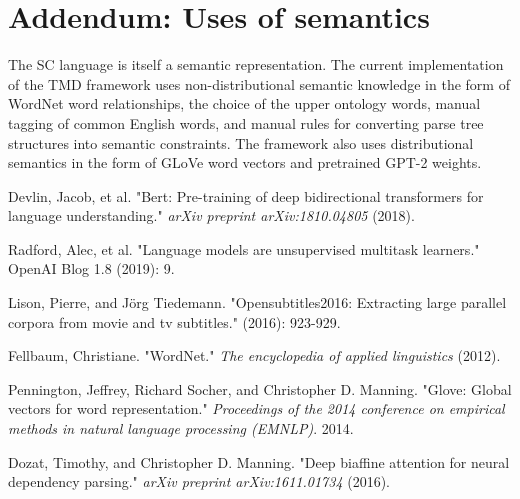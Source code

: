 \documentclass{article}
\numberwithin{equation}{section}
\begin{document}
\section{Addendum: Uses of semantics}
The SC language is itself a semantic representation. The current implementation of the TMD framework uses non-distributional semantic knowledge in the form of WordNet word relationships, the choice of the upper ontology words, manual tagging of common English words, and manual rules for converting parse tree structures into semantic constraints. The framework also uses distributional semantics in the form of GLoVe word vectors and pretrained GPT-2 weights.

\newpage

\begin{thebibliography}{10}

Devlin, Jacob, et al. "Bert: Pre-training of deep bidirectional transformers for language understanding." \textit{arXiv preprint arXiv:1810.04805} (2018).

Radford, Alec, et al. "Language models are unsupervised multitask learners." OpenAI Blog 1.8 (2019): 9.

Lison, Pierre, and Jörg Tiedemann. "Opensubtitles2016: Extracting large parallel corpora from movie and tv subtitles." (2016): 923-929.

Fellbaum, Christiane. "WordNet." \textit{The encyclopedia of applied linguistics} (2012).

Pennington, Jeffrey, Richard Socher, and Christopher D. Manning. "Glove: Global vectors for word representation." \textit{Proceedings of the 2014 conference on empirical methods in natural language processing (EMNLP)}. 2014.

Dozat, Timothy, and Christopher D. Manning. "Deep biaffine attention for neural dependency parsing." \textit{arXiv preprint arXiv:1611.01734} (2016).

\end{thebibliography}
\end{document}
